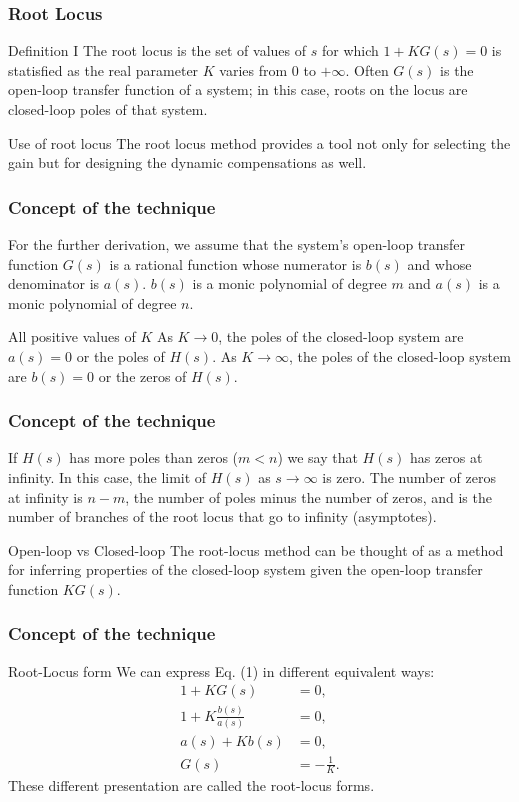 \begin{frame}
\frametitle{Root Locus}
	\begin{block}{Definition I}
		The root locus is the set of values of $s$ for which $1 + KG(s) = 0$ is statisfied as the real parameter $K$ varies from $0$ to $+\infty$. Often $G(s)$ is the open-loop transfer function of a system; in this case, roots on the locus are closed-loop poles of that system.
	\end{block}
	\begin{block}{Use of root locus}
		The root locus method provides a tool not only for selecting the gain but for designing the dynamic compensations as well.
	\end{block}
	
\end{frame}

\begin{frame}
\frametitle{Concept of the technique}
	For the further derivation, we assume that the system's open-loop transfer function $G(s)$ is a rational function whose numerator is $b(s)$ and whose denominator is $a(s)$. $b(s)$ is a monic polynomial of degree $m$ and $a(s)$ is a monic polynomial of degree $n$. 
	\begin{block}{All positive values of $K$}
		As $K \rightarrow 0$, the poles of the closed-loop system are $a(s) = 0$ or the poles of $H(s)$. As $K \rightarrow \infty$, the poles of the closed-loop system are $b(s) = 0$ or the zeros of $H(s)$.
	\end{block}
\end{frame}

\begin{frame}
\frametitle{Concept of the technique}
	If $H(s)$ has more poles than zeros ($m < n$) we say that $H(s)$ has zeros at infinity. In this case, the limit of $H(s)$ as $s \rightarrow \infty$ is zero. The number of zeros at infinity is $n-m$, the number of poles minus the number of zeros, and is the number of branches of the root locus that go to infinity (asymptotes).
	
	\begin{alertblock}{Open-loop vs Closed-loop}
		The root-locus method can be thought of as a method for inferring properties of the closed-loop system given the open-loop transfer function $KG(s)$.
	\end{alertblock}
\end{frame}

\begin{frame}
\frametitle{Concept of the technique}
\begin{block}{Root-Locus form}
	We can express Eq. (1) in different equivalent ways:
	\vspace{-1em}
	\begin{align*}
		1 + KG(s) &= 0,\\
		1 + K\frac{b(s)}{a(s)} &= 0,\\
		a(s) + Kb(s) &=0,\\
		G(s) & = -\frac{1}{K}.
	\end{align*}
	These different presentation are called the root-locus forms.
\end{block}
\end{frame}

